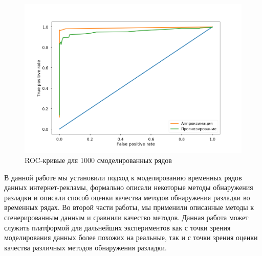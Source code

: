 \documentclass[%
12pt,
master,  %
natbib,      %
subf,        %
substylefile = spbu.rtx,
href,        %
colorlinks,  %
]{disser}
\begin{document}
\begin{figure}[!hhh]
	\begin{center}
		\includegraphics[width=12cm]{roc_pred_approx}
	\end{center}
	\vspace{-5mm}\caption{ROC-кривые для 1000 смоделированных рядов}
	\label{fig:roc_pred_approx}
\end{figure}


\conclusion
В данной работе мы установили подход к моделированию временных рядов данных интернет-рекламы, формально описали некоторые методы обнаружения разладки и описали способ оценки качества методов обнаружения разладки во временных рядах. Во второй части работы, мы применили описанные методы к сгенерированным данным и сравнили качество методов. Данная работа может служить платформой для дальнейших экспериментов как с точки зрения моделирования данных более похожих на реальные, так и с точки зрения оценки качества различных методов обнаружения разладки.

%

%


%

% 


%	

\appendix
\end{document}
